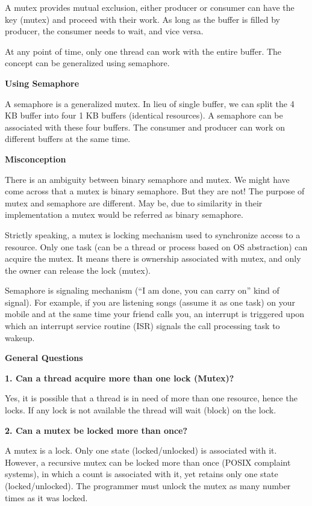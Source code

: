 \documentclass[8pt,landscape]{article}
\begin{document}
\begin{multicols}{3}
\begin{tiny}
A mutex provides mutual exclusion, either producer or consumer can have the key (mutex) and proceed with their work. As long as the buffer is filled by producer, the consumer needs to wait, and vice versa.

At any point of time, only one thread can work with the entire buffer. The concept can be generalized using semaphore.

\textbf{Using Semaphore}

A semaphore is a generalized mutex. In lieu of single buffer, we can split the 4 KB buffer into four 1 KB buffers (identical resources). A semaphore can be associated with these four buffers. The consumer and producer can work on different buffers at the same time.

\textbf{Misconception}

There is an ambiguity between binary semaphore and mutex. We might have come across that a mutex is binary semaphore. But they are not! The purpose of mutex and semaphore are different. May be, due to similarity in their implementation a mutex would be referred as binary semaphore.

Strictly speaking, a mutex is locking mechanism used to synchronize access to a resource. Only one task (can be a thread or process based on OS abstraction) can acquire the mutex. It means there is ownership associated with mutex, and only the owner can release the lock (mutex).

Semaphore is signaling mechanism (“I am done, you can carry on” kind of signal). For example, if you are listening songs (assume it as one task) on your mobile and at the same time your friend calls you, an interrupt is triggered upon which an interrupt service routine (ISR) signals the call processing task to wakeup.

\textbf{General Questions}

\textbf{1. Can a thread acquire more than one lock (Mutex)?}

Yes, it is possible that a thread is in need of more than one resource, hence the locks. If any lock is not available the thread will wait (block) on the lock.

\textbf{2. Can a mutex be locked more than once?}

A mutex is a lock. Only one state (locked/unlocked) is associated with it. However, a recursive mutex can be locked more than once (POSIX complaint systems), in which a count is associated with it, yet retains only one state (locked/unlocked). The programmer must unlock the mutex as many number times as it was locked.


\end{tiny}
\end{multicols}
\end{document}
